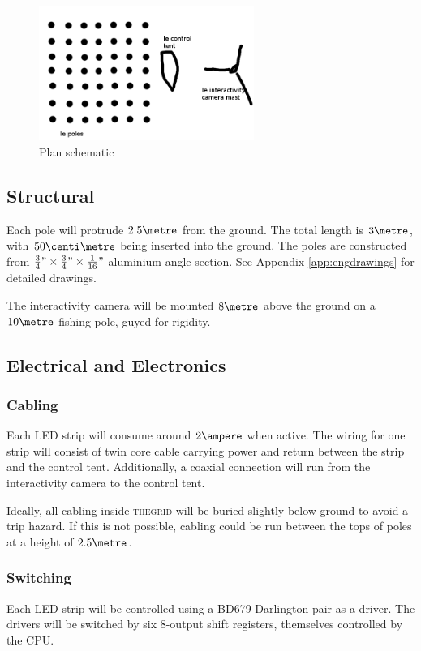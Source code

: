 \documentclass[12pt]{article} %
\newcommand{\thegrid}{\textsc{the\textperiodcentered grid}\xspace}
\begin{document}
\begin{figure}[h]
    \centering
    \includegraphics[width=7cm]{diags/plan.png}
    \caption{Plan schematic}
    \label{fig:planschematic}
\end{figure}

\subsection{Structural}
Each pole will protrude $2.5\metre$ from the ground.  The total length is $3\metre$, with $50\centi\metre$ being inserted into the ground.  The poles are constructed from $\frac{3}{4}" \times \frac{3}{4}" \times \frac{1}{16}"$ aluminium angle section.  See Appendix \ref{app:engdrawings} for detailed drawings.

The interactivity camera will be mounted $8\metre$ above the ground on a $10\metre$ fishing pole, guyed for rigidity.

\subsection{Electrical and Electronics}
\subsubsection{Cabling}
Each LED strip will consume around $2\ampere$ when active.  The wiring for one strip will consist of twin core cable carrying power and return between the strip and the control tent.  Additionally, a coaxial connection will run from the interactivity camera to the control tent.

Ideally, all cabling inside \thegrid will be buried slightly below ground to avoid a trip hazard.  If this is not possible, cabling could be run between the tops of poles at a height of $2.5\metre$.

\subsubsection{Switching}
Each LED strip will be controlled using a BD679 Darlington pair as a driver.  The drivers will be switched by six 8-output shift registers, themselves controlled by the CPU.
\end{document}
